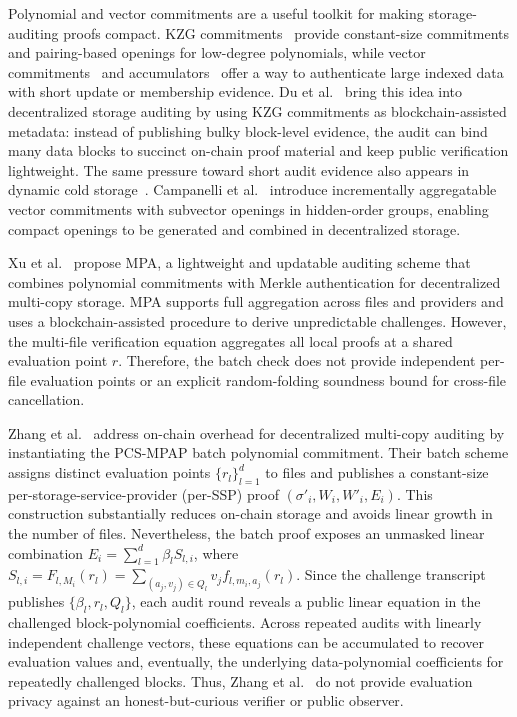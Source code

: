 \documentclass[lettersize,journal]{IEEEtran}
\begin{document}
Polynomial and vector commitments are a useful toolkit for making storage-auditing proofs compact. KZG commitments~\cite{Kate2010KZG} provide constant-size commitments and pairing-based openings for low-degree polynomials, while vector commitments~\cite{Catalano2013VC,Campanelli20ASIACRYPT} and accumulators~\cite{Boneh2019Batching} offer a way to authenticate large indexed data with short update or membership evidence. Du et al.~\cite{Du22TDSC} bring this idea into decentralized storage auditing by using KZG commitments as blockchain-assisted metadata: instead of publishing bulky block-level evidence, the audit can bind many data blocks to succinct on-chain proof material and keep public verification lightweight. The same pressure toward short audit evidence also appears in dynamic cold storage~\cite{Yu2024EDCOMA}.
Campanelli et al.~\cite{Campanelli20ASIACRYPT} introduce incrementally aggregatable vector commitments with subvector openings in hidden-order groups, enabling compact openings to be generated and combined in decentralized storage.



Xu et al.~\cite{XuTIFS26} propose MPA, a lightweight and updatable auditing scheme that combines polynomial commitments with Merkle authentication for decentralized multi-copy storage. MPA supports full aggregation across files and providers and uses a blockchain-assisted procedure to derive unpredictable challenges. However, the multi-file verification equation aggregates all local proofs at a shared evaluation point $r$. Therefore, the batch check does not provide independent per-file evaluation points or an explicit random-folding soundness bound for cross-file cancellation.

Zhang et al.~\cite{ZhangTPDS23} address on-chain overhead for decentralized multi-copy auditing by instantiating the PCS-MPAP batch polynomial commitment. 
Their batch scheme assigns distinct evaluation points $\{r_l\}_{l=1}^d$ to files and publishes a constant-size per-storage-service-provider (per-SSP) proof $(\sigma'_i,W_i,W'_i,E_i)$.
This construction substantially reduces on-chain storage and avoids linear growth in the number of files. Nevertheless, the batch proof exposes an unmasked linear combination \(E_i=\sum_{l=1}^d\beta_lS_{l,i}\), where \(S_{l,i}=F_{l,M_i}(r_l)=\sum_{(a_j,v_j)\in Q_l}v_jf_{l,m_i,a_j}(r_l)\). Since the challenge transcript publishes $\{\beta_l,r_l,Q_l\}$, each audit round reveals a public linear equation in the challenged block-polynomial coefficients. Across repeated audits with linearly independent challenge vectors, these equations can be accumulated to recover evaluation values and, eventually, the underlying data-polynomial coefficients for repeatedly challenged blocks. Thus, Zhang et al.~\cite{ZhangTPDS23} do not provide evaluation privacy against an honest-but-curious verifier or public observer. 
\end{document}
